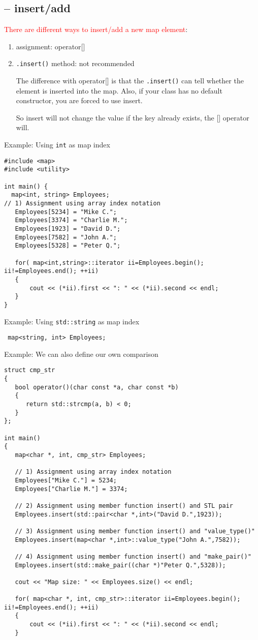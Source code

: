 \subsection{-- insert/add}

\textcolor{red}{There are different ways to insert/add a new map element}: 
\begin{enumerate}
  \item assignment: operator[]
  
  \item \verb!.insert()! method: not recommended
  
  The difference with operator[] is that the \verb!.insert()! can tell whether
  the element is inserted into the map. Also, if your class has no default
  constructor, you are forced to use insert.
  
  So insert will not change the value if the key already exists, the [] operator
  will.
\end{enumerate}

Example: Using \verb!int! as map index
\begin{verbatim}
#include <map>
#include <utility>

int main() {
  map<int, string> Employees;
// 1) Assignment using array index notation
   Employees[5234] = "Mike C.";
   Employees[3374] = "Charlie M.";
   Employees[1923] = "David D.";
   Employees[7582] = "John A.";
   Employees[5328] = "Peter Q.";
   
   for( map<int,string>::iterator ii=Employees.begin(); ii!=Employees.end(); ++ii)
   {
       cout << (*ii).first << ": " << (*ii).second << endl;
   }
}
\end{verbatim}
  

Example: Using \verb!std::string! as map index
\begin{verbatim}
 map<string, int> Employees;
\end{verbatim}

Example: We can also define our own comparison 
\begin{verbatim}
struct cmp_str 
{
   bool operator()(char const *a, char const *b) 
   {
      return std::strcmp(a, b) < 0;
   }
};

int main()
{
   map<char *, int, cmp_str> Employees;

   // 1) Assignment using array index notation
   Employees["Mike C."] = 5234;
   Employees["Charlie M."] = 3374;

   // 2) Assignment using member function insert() and STL pair
   Employees.insert(std::pair<char *,int>("David D.",1923));
 
   // 3) Assignment using member function insert() and "value_type()"
   Employees.insert(map<char *,int>::value_type("John A.",7582));

   // 4) Assignment using member function insert() and "make_pair()"
   Employees.insert(std::make_pair((char *)"Peter Q.",5328));

   cout << "Map size: " << Employees.size() << endl;

   for( map<char *, int, cmp_str>::iterator ii=Employees.begin(); ii!=Employees.end(); ++ii)
   {
       cout << (*ii).first << ": " << (*ii).second << endl;
   }
\end{verbatim}

